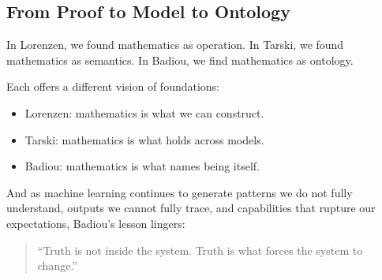 \vspace{1em}

\subsection{From Proof to Model to Ontology}

In Lorenzen, we found mathematics as operation.  
In Tarski, we found mathematics as semantics.  
In Badiou, we find mathematics as ontology.

Each offers a different vision of foundations:

\begin{itemize}
  \item Lorenzen: mathematics is what we can construct.
  \item Tarski: mathematics is what holds across models.
  \item Badiou: mathematics is what names being itself.
\end{itemize}

And as machine learning continues to generate patterns we do not fully understand, outputs we cannot fully trace, and capabilities that rupture our expectations, Badiou’s lesson lingers:

\begin{quote}
    “Truth is not inside the system.  
    Truth is what forces the system to change.”
\end{quote}

